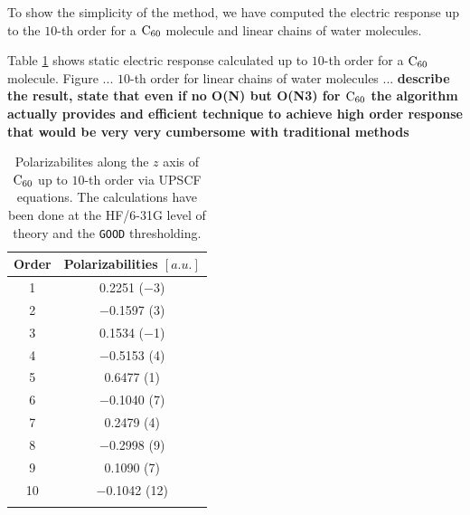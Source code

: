 \documentclass[prl,aps,twocolumn,showpacs,twocolumngrid,superbib]{revtex4}
\begin{document}


To show the simplicity of the method, we have computed 
the electric response up to the $10$-th order for a $\rm C_{60}$
molecule and linear chains of water molecules.

Table \ref{tab:C60_Values} shows static electric response
calculated up to $10$-th order for a $\rm C_{60}$ molecule.
Figure ... $10$-th order for linear chains of water molecules 
... {\bf describe the result, state
that even if no O(N) but O(N3) for $\rm C_{60}$ the algorithm actually 
provides and efficient technique to achieve high order response that
would be very very cumbersome with traditional methods}

\begin{table}[t]
  \centering
  \caption{
    Polarizabilites along the $z$ axis of $\rm C_{60}$ up 
    to $10$-th order via UPSCF equations.
    The calculations have been done at the HF/6-31G level of 
    theory and the {\tt GOOD} thresholding.
  }\label{tab:C60_Values}
  \begin{tabular}{cc}
    \toprule
    Order & Polarizabilities $[a.u.]$\\
    \hline
     1 &    0.2251 ($-$3)\\
     2 & $-$0.1597 (3)   \\
     3 &    0.1534 ($-$1)\\
     4 & $-$0.5153 (4)   \\
     5 &    0.6477 (1)   \\
     6 & $-$0.1040 (7)   \\
     7 &    0.2479 (4)   \\
     8 & $-$0.2998 (9)   \\
     9 &    0.1090 (7)   \\
    10 & $-$0.1042 (12)  \\
    \botrule
  \end{tabular}
\end{table}
\end{document}
